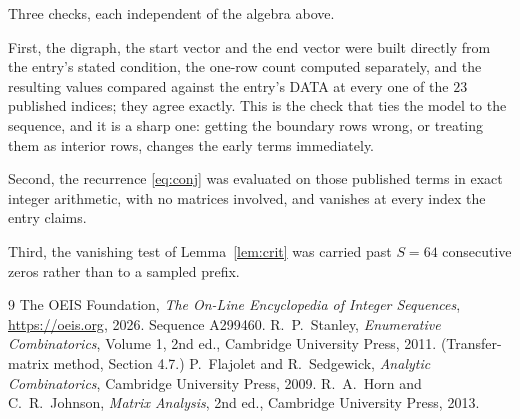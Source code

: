 \documentclass[11pt,a4paper]{article}
\theoremstyle{plain}
\theoremstyle{definition}
\begin{document}
Three checks, each independent of the algebra above.

First, the digraph, the start vector and the end vector were built directly from the
entry's stated condition, the one-row count computed separately, and the resulting values
compared against the entry's DATA at every one of the $23$ published indices; they
agree exactly. This is the check that ties the model to the sequence, and it is a sharp one:
getting the boundary rows wrong, or treating them as interior rows, changes the early terms
immediately.

Second, the recurrence \eqref{eq:conj} was evaluated on those published terms in exact
integer arithmetic, with no matrices involved, and vanishes at every index the entry claims.

Third, the vanishing test of Lemma~\ref{lem:crit} was carried past $S=64$ consecutive
zeros rather than to a sampled prefix.

\begin{thebibliography}{9}
 The OEIS Foundation, \emph{The On-Line Encyclopedia of Integer
Sequences}, \url{https://oeis.org}, 2026. Sequence A299460.
 R.~P.~Stanley, \emph{Enumerative Combinatorics}, Volume 1, 2nd ed.,
Cambridge University Press, 2011. (Transfer-matrix method, Section 4.7.)
 P.~Flajolet and R.~Sedgewick, \emph{Analytic Combinatorics}, Cambridge
University Press, 2009.
 R.~A.~Horn and C.~R.~Johnson, \emph{Matrix Analysis}, 2nd ed., Cambridge
University Press, 2013.
\end{thebibliography}
\end{document}
